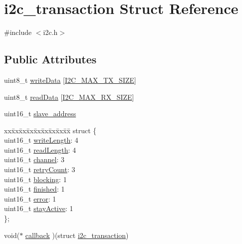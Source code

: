 \hypertarget{structi2c__transaction}{}\section{i2c\+\_\+transaction Struct Reference}
\label{structi2c__transaction}


{\ttfamily \#include $<$i2c.\+h$>$}

\subsection*{Public Attributes}
\begin{DoxyCompactItemize}
\item 
uint8\+\_\+t \mbox{\hyperlink{structi2c__transaction_a94035cb7ae168f3af5cfd510c5ad2d07}{write\+Data}} \mbox{[}\mbox{\hyperlink{project__settings_8h_a7f177b43ed9acb3a242d59bb0634d472}{I2\+C\+\_\+\+M\+A\+X\+\_\+\+T\+X\+\_\+\+S\+I\+ZE}}\mbox{]}
\item 
uint8\+\_\+t \mbox{\hyperlink{structi2c__transaction_ab31c4effe7e39b1daa34bdbaf81d9c26}{read\+Data}} \mbox{[}\mbox{\hyperlink{project__settings_8h_ad2b555d7882359c024c831c844d28f69}{I2\+C\+\_\+\+M\+A\+X\+\_\+\+R\+X\+\_\+\+S\+I\+ZE}}\mbox{]}
\item 
uint16\+\_\+t \mbox{\hyperlink{structi2c__transaction_a39355aaf2ca79cfee2f4c48e692fdac4}{slave\+\_\+address}}
\item 
\begin{tabbing}
xx\=xx\=xx\=xx\=xx\=xx\=xx\=xx\=xx\=\kill
struct \{\\
\>uint16\_t \mbox{\hyperlink{structi2c__transaction_ab8a9791877d01a031701758f2dd8973f}{writeLength}}: 4\\
\>uint16\_t \mbox{\hyperlink{structi2c__transaction_adce12eadeb7ab26aca578b88ed257cf6}{readLength}}: 4\\
\>uint16\_t \mbox{\hyperlink{structi2c__transaction_a2528939b8dab26063413e929081aa990}{channel}}: 3\\
\>uint16\_t \mbox{\hyperlink{structi2c__transaction_a9a1d418ee705e0563d6f00ae6703153b}{retryCount}}: 3\\
\>uint16\_t \mbox{\hyperlink{structi2c__transaction_a8194807e4e35ff63c815e8865e2b35a8}{blocking}}: 1\\
\>uint16\_t \mbox{\hyperlink{structi2c__transaction_afd27122dedf3a0a08b1f1930219e0f8d}{finished}}: 1\\
\>uint16\_t \mbox{\hyperlink{structi2c__transaction_aaa551080eff5d54dc147058100f64091}{error}}: 1\\
\>uint16\_t \mbox{\hyperlink{structi2c__transaction_acc5a5b5ac6be9b67a1d0e6d62ddb6b6b}{stayActive}}: 1\\
\}; \\

\end{tabbing}\item 
void($\ast$ \mbox{\hyperlink{structi2c__transaction_aa5519941867a3e28ccb32fc9c5919bde}{callback}} )(struct \mbox{\hyperlink{structi2c__transaction}{i2c\+\_\+transaction}})
\end{DoxyCompactItemize}


